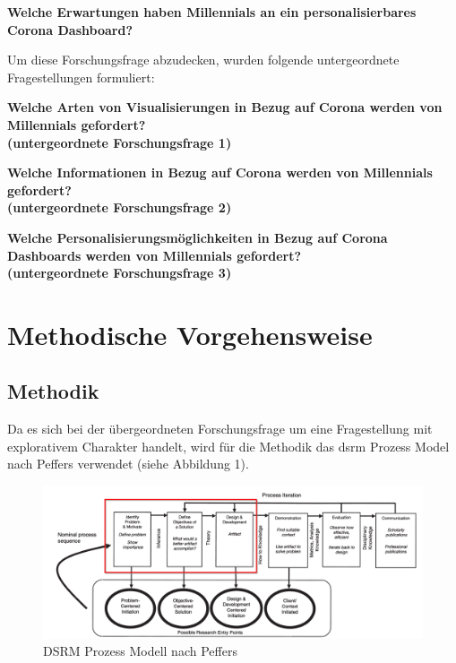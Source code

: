 \documentclass[12pt, oneside]{article}
\begin{document}
\begin{center}
    \textbf{Welche Erwartungen haben Millennials an ein personalisierbares Corona Dashboard?}
\end{center}

Um diese Forschungsfrage abzudecken, wurden folgende untergeordnete Fragestellungen formuliert:

\begin{center}
    \textbf{Welche Arten von Visualisierungen in Bezug auf Corona werden von Millennials gefordert?\\
        (untergeordnete Forschungsfrage 1)}
\end{center}

\begin{center}
    \textbf{Welche Informationen in Bezug auf Corona werden von Millennials gefordert?\\
        (untergeordnete Forschungsfrage 2)}
\end{center}

\begin{center}
    \textbf{Welche Personalisierungsmöglichkeiten in Bezug auf Corona Dashboards werden von Millennials gefordert?\\
        (untergeordnete Forschungsfrage 3)}
\end{center}

\clearpage
\section{Methodische Vorgehensweise}
\subsection{Methodik}
Da es sich bei der übergeordneten Forschungsfrage um eine Fragestellung mit explorativem Charakter handelt, wird für die Methodik das \Gls{dsrm} Prozess Model nach Peffers verwendet (siehe Abbildung 1).


\begin{figure}[ht]
    \includegraphics[width=12cm]{images/peffers_dsr_model.png}
    \centering
    \caption{DSRM Prozess Modell nach Peffers ~\citep{K.Peffers.2007}}
\end{figure}
\end{document}
